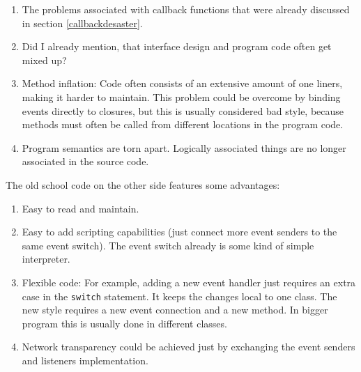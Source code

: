 \begin{enumerate}
\item
  The problems associated with callback functions that were already
  discussed in section \ref{callbackdesaster}.
\item
  Did I already mention, that interface design and program code often
  get mixed up?
\item
  Method inflation: Code often consists of an extensive amount of one
  liners, making it harder to maintain. This problem could be overcome
  by binding events directly to closures, but this is usually considered
  bad style, because methods must often be called from different
  locations in the program code.
\item
  Program semantics are torn apart. Logically associated things are no
  longer associated in the source code.
\end{enumerate}

The old school code on the other side features some advantages:

\begin{enumerate}
\item
  Easy to read and maintain.
\item
  Easy to add scripting capabilities (just connect more event senders to
  the same event switch). The event switch already is some kind of
  simple interpreter.
\item
  Flexible code: For example, adding a new event handler just requires
  an extra case in the \texttt{switch} statement. It keeps the changes
  local to one class. The new style requires a new event connection and
  a new method. In bigger program this is usually done in different
  classes.
\item
  Network transparency could be achieved just by exchanging the event
  senders and listeners implementation.
\end{enumerate}

